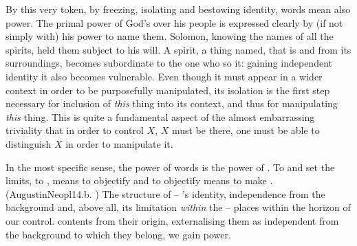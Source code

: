 \label{pa:wordsPower}  
By this very token, by freezing, isolating and bestowing identity, words mean
also power. The primal power of God's over his people is expressed clearly by
(if not simply  with) his power to name them. Solomon, knowing
the names of all the spirits, held them subject to his will. A spirit, a thing named,
that is  and  from its surroundings, becomes
subordinate to the one who so  it: gaining independent identity
it also becomes vulnerable.  Even though it must appear in a wider context in
order to be purposefully manipulated, its isolation is the first step necessary
for inclusion of {\em this} thing into its  context, and thus for
manipulating {\em this} thing. This is quite a fundamental aspect of the almost
embarrassing triviality that in order to control $X$, $X$ must be there, one
must be able to distinguish $X$ in order to manipulate it.

In the most specific sense, the power of words is the power of .
To  and set the limits, to , means to {objectify}
and to {objectify} means to make . (\citet{To see means: to give
  preliminarily an object as an object. [...] seeing has the meaning of making
  available (of something object-like) in the distinctive sense of pure
  acquainting (with things).}{AugustinNeopl}{\para 14.b. \noo{[p.219]}}) The
structure of  -- 's identity, independence from the
background and, above all, its limitation {\em within} the \hoa -- places
 within the horizon of our control.  contents from
their origin, externalising them as  independent from the background
to which they belong, we gain power.


